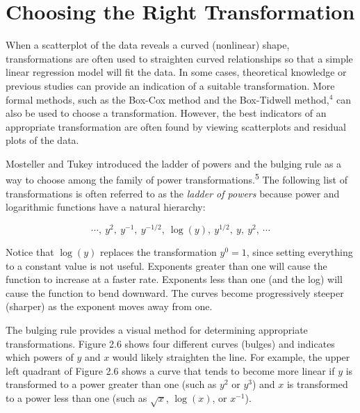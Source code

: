 \documentclass[
]{report}
\begin{document}
\section*{Choosing the Right Transformation}\label{choosing-the-right-transformation}

When a scatterplot of the data reveals a curved (nonlinear) shape, transformations are often used to straighten curved relationships so that a simple linear regression model will fit the data. In some cases, theoretical knowledge or previous studies can provide an indication of a suitable transformation. More formal methods, such as the Box-Cox method and the Box-Tidwell method,\(^4\) can also be used to choose a transformation. However, the best indicators of an appropriate transformation are often found by viewing scatterplots and residual plots of the data.

Mosteller and Tukey introduced the ladder of powers and the bulging rule as a way to choose among the family of power transformations.\textsuperscript{5} The following list of transformations is often referred to as the \emph{ladder of powers} because power and logarithmic functions have a natural hierarchy:

\[
\cdots,\ y^2,\ y^{-1},\ y^{-1/2},\ \log(y),\ y^{1/2},\ y,\ y^2,\ \cdots
\]

Notice that \(\log(y)\) replaces the transformation \(y^0 = 1\), since setting everything to a constant value is not useful. Exponents greater than one will cause the function to increase at a faster rate. Exponents less than one (and the log) will cause the function to bend downward. The curves become progressively steeper (sharper) as the exponent moves away from one.

The bulging rule provides a visual method for determining appropriate transformations. Figure 2.6 shows four different curves (bulges) and indicates which powers of \(y\) and \(x\) would likely straighten the line. For example, the upper left quadrant of Figure 2.6 shows a curve that tends to become more linear if \(y\) is transformed to a power greater than one (such as \(y^2\) or \(y^3\)) and \(x\) is transformed to a power less than one (such as \(\sqrt{x}\), \(\log(x)\), or \(x^{-1}\)).
\end{document}
